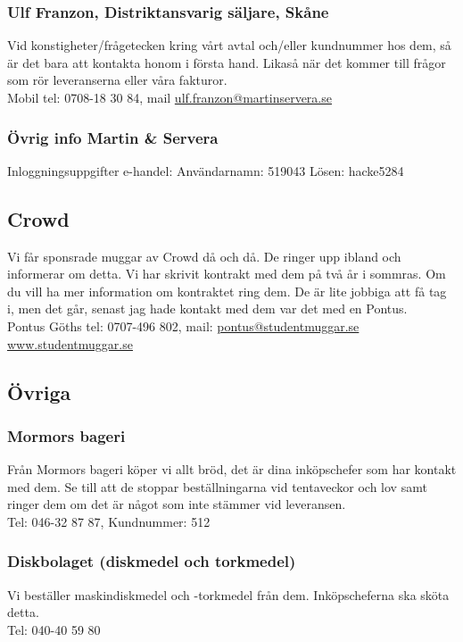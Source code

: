 \documentclass[10pt]{article}
\begin{document}
\subsubsection*{Ulf Franzon, Distriktansvarig säljare, Skåne}
Vid konstigheter/frågetecken kring vårt avtal och/eller kundnummer hos dem, så är det bara att kontakta honom i första hand. Likaså när det kommer till frågor som rör leveranserna eller våra fakturor.\\
Mobil tel: {0708-18 30 84}, mail \url{ulf.franzon@martinservera.se}

\subsubsection*{Övrig info Martin \& Servera}
Inloggningsuppgifter e-handel: Användarnamn: {519043} Lösen: {hacke5284}

\subsection*{Crowd}
Vi får sponsrade muggar av Crowd då och då. De ringer upp ibland och informerar om detta. Vi har skrivit kontrakt med dem på två år i sommras. Om du vill ha mer information om kontraktet ring dem. De är lite jobbiga att få tag i, men det går, senast jag hade kontakt med dem var det med en Pontus.\\
Pontus Göths tel: {0707-496 802}, mail: \url{pontus@studentmuggar.se}\
\\\url{www.studentmuggar.se}

\subsection*{Övriga}
\subsubsection*{Mormors bageri}
Från Mormors bageri köper vi allt bröd, det är dina inköpschefer som har kontakt med dem. Se till att de stoppar beställningarna vid tentaveckor och lov samt ringer dem om det är något som inte stämmer vid leveransen.\\
Tel: {046-32 87 87}, Kundnummer: {512}

\subsubsection*{Diskbolaget (diskmedel och torkmedel)}
Vi beställer maskindiskmedel och -torkmedel från dem. Inköpscheferna ska sköta detta.\\
Tel: {040-40 59 80}
\end{document}
